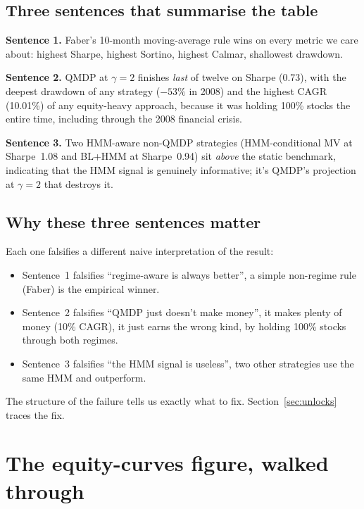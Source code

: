 \documentclass[11pt]{article}
\begin{document}
\subsection{Three sentences that summarise the table}

\textbf{Sentence 1.} Faber's 10-month moving-average rule wins on every metric we care about: highest Sharpe, highest Sortino, highest Calmar, shallowest drawdown.

\textbf{Sentence 2.} QMDP at $\gamma = 2$ finishes \emph{last} of twelve on Sharpe (0.73), with the deepest drawdown of any strategy ($-53\%$ in 2008) and the highest CAGR (10.01\%) of any equity-heavy approach, because it was holding 100\% stocks the entire time, including through the 2008 financial crisis.

\textbf{Sentence 3.} Two HMM-aware non-QMDP strategies (HMM-conditional MV at Sharpe~1.08 and BL+HMM at Sharpe~0.94) sit \emph{above} the static benchmark, indicating that the HMM signal is genuinely informative; it's QMDP's projection at $\gamma = 2$ that destroys it.

\subsection{Why these three sentences matter}

Each one falsifies a different naive interpretation of the result:

\begin{itemize}
  \item Sentence~1 falsifies ``regime-aware is always better'', a simple non-regime rule (Faber) is the empirical winner.
  \item Sentence~2 falsifies ``QMDP just doesn't make money'', it makes plenty of money (10\% CAGR), it just earns the wrong kind, by holding 100\% stocks through both regimes.
  \item Sentence~3 falsifies ``the HMM signal is useless'', two other strategies use the same HMM and outperform.
\end{itemize}

The structure of the failure tells us exactly what to fix. Section~\ref{sec:unlocks} traces the fix.

\section{The equity-curves figure, walked through}
\end{document}

